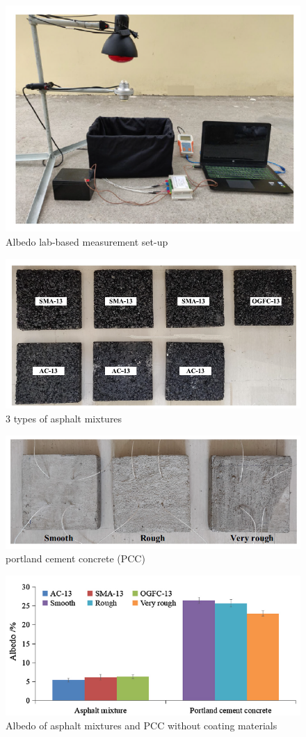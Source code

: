 \begin{figure}[!tb]
    \centering
    \includegraphics[width=0.8\linewidth]{./figures/measurement-literature/albedometer-lab.png}
    \caption{Albedo lab-based measurement set-up}
    \label{fig:albedometer-lab}
\end{figure}

\begin{figure}[!tb]
    \centering
    \includegraphics[width=0.8\linewidth]{./figures/measurement-literature/asphalt-mixture.png}
    \caption{3 types of asphalt mixtures}
    \label{fig:asphalt-mixture}
\end{figure}


\begin{figure}[!tb]
    \centering
    \includegraphics[width=0.8\linewidth]{./figures/measurement-literature/PCC.png}
    \caption{portland cement concrete (PCC)}
    \label{fig:pcc}
\end{figure}

\begin{figure}[!tb]
    \centering
    \includegraphics[width=0.8\linewidth]{./figures/measurement-literature/albedo-pcc-asphalt-mixture.png}
    \caption{Albedo of asphalt mixtures and PCC without coating materials}
    \label{fig:albedo-pcc-asphalt-mixture}
\end{figure}

